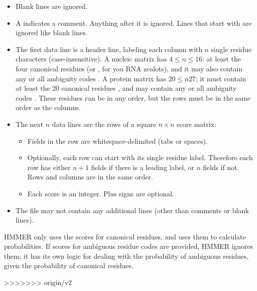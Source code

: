 \begin{itemize}

\item Blank lines are ignored.

\item A \mono{\#} indicates a comment. Anything after it is
  ignored. Lines that start with \mono{\#} are ignored like blank
  lines.

\item The first data line is a header line, labeling each column with
  $n$ single residue characters (case-insensitive). A nucleic matrix
  has $4 \leq n \leq 16$: at least the four canonical residues
   (or , for you RNA zealots), and it may also
  contain any or all ambiguity codes . A protein
  matrix has $20 \leq n 27$; it must contain at least the 20 canonical
  residues , and may contain any or all
  ambiguity codes . These residues can be in any order,
  but the rows must be in the same order as the columns.

\item The next $n$ data lines are the rows of a square $n \times n$
  score matrix:

\begin{itemize}
\item  Fields in the row are whitespace-delimited (tabs or
       spaces).

\item Optionally, each row can start with its single residue label.
  Therefore each row has either $n+1$ fields if there is a leading
  label, or $n$ fields if not. Rows and columns are in the same order.

\item  Each score is an integer. Plus signs are optional. 
\end{itemize}

\item The file may not contain any additional lines (other than
  comments or blank lines).
\end{itemize}

HMMER only uses the scores for canonical residues, and uses them to
calculate probabilities. If scores for ambiguous residue codes are
provided, HMMER ignores them; it has its own logic for dealing with
the probability of ambiguous residues, given the probability of
canonical residues.






  
>>>>>>> origin/v2
